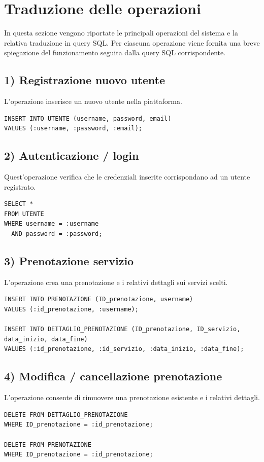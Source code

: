 \documentclass[a4paper,12pt]{report}
\begin{document}
\section{Traduzione delle operazioni}

In questa sezione vengono riportate le principali operazioni del sistema
e la relativa traduzione in query SQL.
Per ciascuna operazione viene fornita una breve spiegazione del funzionamento seguita dalla query SQL corrispondente.

\subsection*{1) Registrazione nuovo utente}
L’operazione inserisce un nuovo utente nella piattaforma.
\begin{verbatim}
INSERT INTO UTENTE (username, password, email)
VALUES (:username, :password, :email);
\end{verbatim}

\subsection*{2) Autenticazione / login}
Quest'operazione verifica che le credenziali inserite corrispondano ad un utente registrato.
\begin{verbatim}
SELECT *
FROM UTENTE
WHERE username = :username
  AND password = :password;
\end{verbatim}

\subsection*{3) Prenotazione servizio}
L'operazione crea una prenotazione e i relativi dettagli sui servizi scelti.
\begin{verbatim}
INSERT INTO PRENOTAZIONE (ID_prenotazione, username)
VALUES (:id_prenotazione, :username);

INSERT INTO DETTAGLIO_PRENOTAZIONE (ID_prenotazione, ID_servizio, 
data_inizio, data_fine)
VALUES (:id_prenotazione, :id_servizio, :data_inizio, :data_fine);
\end{verbatim}

\subsection*{4) Modifica / cancellazione prenotazione}
L'operazione consente di rimuovere una prenotazione esistente e i relativi dettagli.
\begin{verbatim}
DELETE FROM DETTAGLIO_PRENOTAZIONE
WHERE ID_prenotazione = :id_prenotazione;

DELETE FROM PRENOTAZIONE
WHERE ID_prenotazione = :id_prenotazione;
\end{verbatim}
\end{document}
